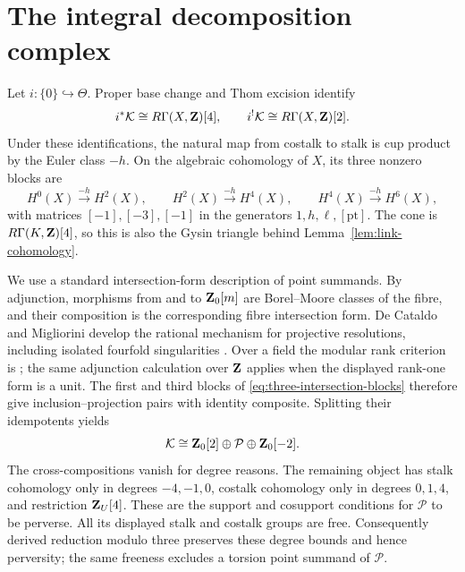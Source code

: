 \section{The integral decomposition complex}\label{sec:integral-decomposition}

Let \(i:\{0\}\hookrightarrow\Theta\).  Proper base change and Thom
excision identify
\begin{equation}\label{eq:stalk-costalk}
 i^*\mathcal K\cong R\Gamma(X,\mathbf Z)[4],\qquad
 i^!\mathcal K\cong R\Gamma(X,\mathbf Z)[2].
\end{equation}
Under these identifications, the natural map from costalk to stalk is cup
product by the Euler class \(-h\).  On the algebraic cohomology of \(X\),
its three nonzero blocks are
\begin{equation}\label{eq:three-intersection-blocks}
 H^0(X)\xrightarrow{-h}H^2(X),\qquad
 H^2(X)\xrightarrow{-h}H^4(X),\qquad
 H^4(X)\xrightarrow{-h}H^6(X),
\end{equation}
with matrices \([-1],[-3],[-1]\) in the generators
\(1,h,\ell,[\mathrm{pt}]\).  The cone is
\(R\Gamma(K,\mathbf Z)[4]\), so this is also the Gysin triangle behind
Lemma~\ref{lem:link-cohomology}.

We use a standard intersection-form description of point summands.  By
adjunction, morphisms from and to \(\mathbf Z_0[m]\) are Borel--Moore classes of
the fibre, and their composition is the corresponding fibre intersection
form.  De Cataldo and Migliorini develop the rational mechanism for
projective resolutions, including isolated fourfold singularities
\cite[Sections~2.4 and~4.4]{deCataldoMigliorini}.  Over a field the modular
rank criterion is
\cite[Proposition~3.2 and Corollary~3.5]{JuteauMautnerWilliamson}; the same
adjunction calculation over \(\mathbf Z\) applies when the displayed rank-one form
is a unit.  The first and third blocks of
\eqref{eq:three-intersection-blocks} therefore give inclusion--projection
pairs with identity composite.  Splitting their idempotents yields
\[
 \mathcal K\cong\mathbf Z_0[2]\oplus\mathcal P\oplus\mathbf Z_0[-2].
\]
The cross-compositions vanish for degree reasons.  The remaining object has
stalk cohomology only in degrees \(-4,-1,0\), costalk cohomology only in
degrees \(0,1,4\), and restriction \(\mathbf Z_U[4]\).  These are the support and
cosupport conditions for \(\mathcal P\) to be perverse.
All its displayed stalk and costalk groups are free.  Consequently derived
reduction modulo three preserves these degree bounds and hence perversity;
the same freeness excludes a torsion point summand of \(\mathcal P\).

